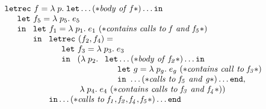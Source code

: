 \begin{equation}
\label{FuntionalCascadeFunLambda}
\begin{array}{l}
  \mathtt{letrec}\ f = \lambda\; p.\;
  \mathtt{let} \ldots (* \mathit{body\ of\ f}*)\ldots \mathtt{in}\\
  \quad \begin{array}{l}
          \mathtt{let}\ f_5 = \lambda\; p_5.\; e_5\\ \mathtt{in}\  
          \begin{array}[t]{l}
            \mathtt{let}\ f_1 = \lambda\;  p_1.\; e_1\ 
                 (* \mathit{contains\ calls\ to\ f\ and\ f_5}*) \\ \mathtt{in}\ 
            \begin{array}[t]{l}
                \mathtt{letrec}\ (f_2, f_4) =\\ 
                 \quad 
                 \begin{array}{l}
                   \mathtt{let}\ f_3 = \lambda\; p_3.\; e_3\\ \mathtt{in}\ 
                   \begin{array}[t]{l}
                   (\lambda\; p_2.\; 
                       \begin{array}[t]{l}
                         \mathtt{let} \ldots (* \mathit{body\ of\ f_2}*)\ldots
                         \mathtt{in}\\
                         \quad \begin{array}{l}
                           \mathtt{let}\ g = \lambda\; p_g.\; e_g\
                              (* \mathit{contains\ call\ to\ f_3}*)\\ 
                           \mathtt{in}\   \ldots 
                                 (* \mathit{calls\ to\ f_5\ and\ g} *)
                           \ldots \mathtt{end},
                         \end{array}
                       \end{array}\\
                    \; \lambda\; p_4.\; e_4\
                       (* \mathit{contains\ calls\ to\ f_3\ and\ f_4}*))
                  \end{array}
                \end{array}\\
                \mathtt{in} \ldots 
                    (* \mathit{calls\ to\ f_1, f_2, f_4, f_5}*)
                 \ldots \mathtt{end}
            \end{array}
          \end{array}
        \end{array}
  \end{array}
\end{equation}
